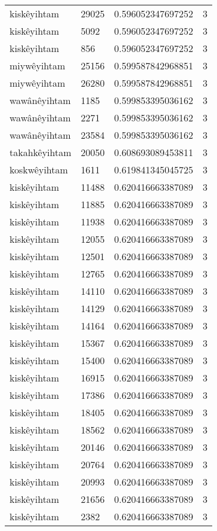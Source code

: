\begin{longtable}{llll}
kiskêyihtam & 29025 & 0.596052347697252 & 3 \\
kiskêyihtam & 5092 & 0.596052347697252 & 3 \\
kiskêyihtam & 856 & 0.596052347697252 & 3 \\
miywêyihtam & 25156 & 0.599587842968851 & 3 \\
miywêyihtam & 26280 & 0.599587842968851 & 3 \\
wawânêyihtam & 1185 & 0.599853395036162 & 3 \\
wawânêyihtam & 2271 & 0.599853395036162 & 3 \\
wawânêyihtam & 23584 & 0.599853395036162 & 3 \\
takahkêyihtam & 20050 & 0.608693089453811 & 3 \\
koskwêyihtam & 1611 & 0.619841345045725 & 3 \\
kiskêyihtam & 11488 & 0.620416663387089 & 3 \\
kiskêyihtam & 11885 & 0.620416663387089 & 3 \\
kiskêyihtam & 11938 & 0.620416663387089 & 3 \\
kiskêyihtam & 12055 & 0.620416663387089 & 3 \\
kiskêyihtam & 12501 & 0.620416663387089 & 3 \\
kiskêyihtam & 12765 & 0.620416663387089 & 3 \\
kiskêyihtam & 14110 & 0.620416663387089 & 3 \\
kiskêyihtam & 14129 & 0.620416663387089 & 3 \\
kiskêyihtam & 14164 & 0.620416663387089 & 3 \\
kiskêyihtam & 15367 & 0.620416663387089 & 3 \\
kiskêyihtam & 15400 & 0.620416663387089 & 3 \\
kiskêyihtam & 16915 & 0.620416663387089 & 3 \\
kiskêyihtam & 17386 & 0.620416663387089 & 3 \\
kiskêyihtam & 18405 & 0.620416663387089 & 3 \\
kiskêyihtam & 18562 & 0.620416663387089 & 3 \\
kiskêyihtam & 20146 & 0.620416663387089 & 3 \\
kiskêyihtam & 20764 & 0.620416663387089 & 3 \\
kiskêyihtam & 20993 & 0.620416663387089 & 3 \\
kiskêyihtam & 21656 & 0.620416663387089 & 3 \\
kiskêyihtam & 2382 & 0.620416663387089 & 3 \\

\end{longtable}

